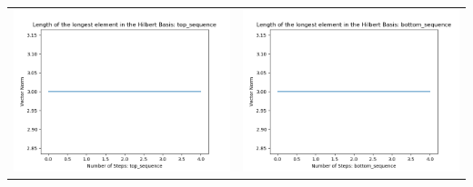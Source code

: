 \documentclass[10pt]{article}
\begin{document}
\begin{tabular}{c|c}
\begin{minipage}{.45\textwidth}
\includegraphics[width=\textwidth]{"DATA/4d/5 generators 2 bound B/top_sequence LENGTH"}
\end{minipage} &
\begin{minipage}{.45\textwidth}
\includegraphics[width=\textwidth]{"DATA/4d/5 generators 2 bound B bottomup/bottom_sequence LENGTH"}
\end{minipage}
\end{tabular}
\end{document}
